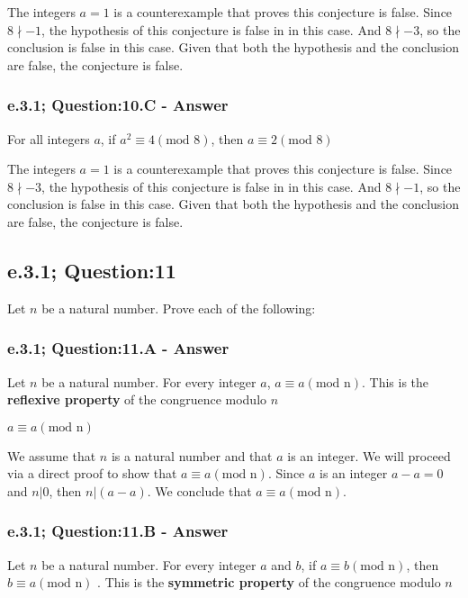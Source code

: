 The integers $a=1$ is a counterexample that proves this conjecture is false. Since $8 \nmid -1$, the hypothesis of this conjecture is false in in this case. And $8 \nmid -3$, so the conclusion is false in this case. Given that both the hypothesis and the conclusion are false, the conjecture is false.


\subsubsection*{e.3.1; Question:10.C - Answer}
For all integers $a$, if $a^2 \equiv 4 (\text{mod 8})$, then $a \equiv 2 (\text{mod 8})$

The integers $a=1$ is a counterexample that proves this conjecture is false. Since $8 \nmid -3$, the hypothesis of this conjecture is false in in this case. And $8 \nmid -1$, so the conclusion is false in this case. Given that both the hypothesis and the conclusion are false, the conjecture is false.


\newpage
\subsection{e.3.1; Question:11}
Let $n$ be a natural number. Prove each of the following: 
\subsubsection*{e.3.1; Question:11.A - Answer}
Let $n$ be a natural number. For every integer $a$, $a \equiv a (\text{mod n})$. This is the {\bf reflexive  property} of the congruence modulo $n$

\begin{tcolorbox}
	\begin{theorem}
		$a \equiv a (\text{mod n})$
	\end{theorem}
\end{tcolorbox}

We assume that $n$ is a natural number and that $a$ is an integer. We will proceed via a direct proof to show that $a \equiv a (\text{mod n})$. Since $a$ is an integer $a-a = 0$ and $n | 0$, then $n|(a-a)$. We conclude that $a \equiv a (\text{mod n})$.






\subsubsection*{e.3.1; Question:11.B - Answer}
Let $n$ be a natural number. For every integer $a$ and $b$, if $a \equiv b (\text{mod n})$, then $b \equiv a (\text{mod n})$ . This is the {\bf symmetric  property} of the congruence modulo $n$

